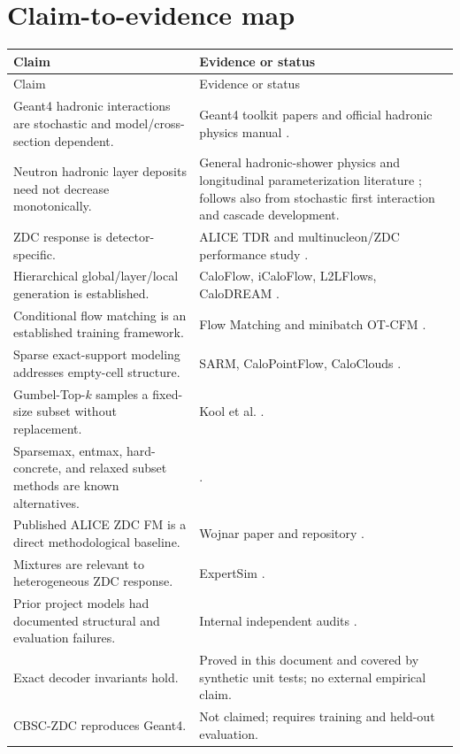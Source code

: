 \documentclass[11pt]{article}
\theoremstyle{definition}
\theoremstyle{remark}
\begin{document}
\section{Claim-to-evidence map}
\begin{longtable}{p{}p{}}
\toprule
Claim & Evidence or status \\
\midrule
\endfirsthead
\toprule
Claim & Evidence or status \\
\midrule
\endhead
Geant4 hadronic interactions are stochastic and model/cross-section dependent. & Geant4 toolkit papers and official hadronic physics manual \citep{geant4_2003,geant4_2016,geant4_hadronic_manual}. \\
Neutron hadronic layer deposits need not decrease monotonically. & General hadronic-shower physics and longitudinal parameterization literature \citep{hadronic_profile}; follows also from stochastic first interaction and cascade development. \\
ZDC response is detector-specific. & ALICE TDR and multinucleon/ZDC performance study \citep{alice_zdc_tdr,zdc_multinucleon}. \\
Hierarchical global/layer/local generation is established. & CaloFlow, iCaloFlow, L2LFlows, CaloDREAM \citep{caloflow,icaloflow,l2lflows,calodream}. \\
Conditional flow matching is an established training framework. & Flow Matching and minibatch OT-CFM \citep{flowmatching,otcfm}. \\
Sparse exact-support modeling addresses empty-cell structure. & SARM, CaloPointFlow, CaloClouds \citep{sarm,calopointflow,caloclouds}. \\
Gumbel-Top-$k$ samples a fixed-size subset without replacement. & Kool et al. \citep{gumbeltopk}. \\
Sparsemax, entmax, hard-concrete, and relaxed subset methods are known alternatives. & \citep{sparsemax,entmax,hardconcrete,relaxedsubset}. \\
Published ALICE ZDC FM is a direct methodological baseline. & Wojnar paper and repository \citep{fasterzdc,fasterzdc_code}. \\
Mixtures are relevant to heterogeneous ZDC response. & ExpertSim \citep{expertsim}. \\
Prior project models had documented structural and evaluation failures. & Internal independent audits \citep{project_legacy_audit,project_hgf_audit}. \\
Exact decoder invariants hold. & Proved in this document and covered by synthetic unit tests; no external empirical claim. \\
CBSC-ZDC reproduces Geant4. & Not claimed; requires training and held-out evaluation. \\
\bottomrule
\end{longtable}
\end{document}
